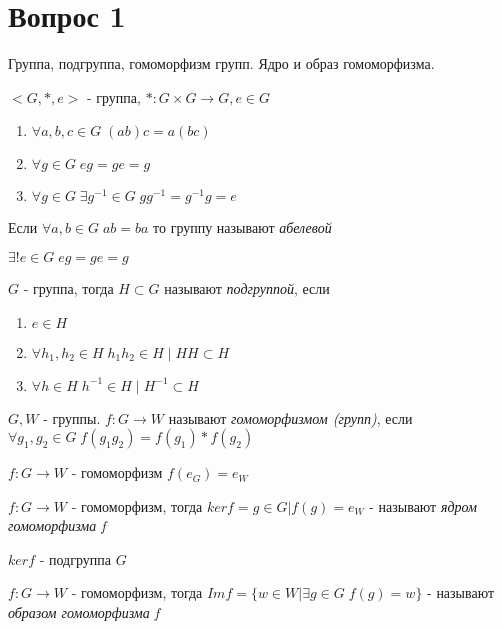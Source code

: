 \section{Вопрос 1}

Группа, подгруппа, гомоморфизм групп. Ядро и образ гомоморфизма. \newline

\begin{defn}
   \(<G, *, e>\) - группа, 
   \(*: G \times G \rightarrow G, e \in G \) 
   \begin{enumerate}       
     \item \( \forall a, b, c \in G \; (ab)c=a(bc) \)
     \item \( \forall g \in G \; eg = ge = g \)
     \item \( \forall g \in G \; \exists g^{-1} \in G \; gg^{-1} = g^{-1}g = e \)
   \end{enumerate}
   Если \( \forall a, b \in G \; ab = ba \) то группу называют \emph{абелевой} 
\end{defn}

\begin{thm}
  \( \exists ! e \in G \; eg = ge = g \)
\end{thm}

\begin{defn}
  \( G \) - группа, тогда \( H \subset G \) называют \emph{подгруппой}, если 
  \begin{enumerate}
    \item \( e \in H \)
    \item \( \forall h_1, h_2 \in H \; h_{1}h_{2} \in H \; | \; HH \subset H \)
    \item \( \forall h \in H \; h^{-1} \in H \; | \; H^{-1} \subset H \)
  \end{enumerate}
\end{defn}

\begin{defn}
  \( G, W \) - группы. \newline
  \( f: G \rightarrow W \) называют \emph{гомоморфизмом (групп)}, если \( \forall g_1, g_2 \in G \; f(g_{1}g_2) = f(g_1) * f(g_2) \)
\end{defn}

\begin{thm}
  \( f: G \rightarrow W \) - гомоморфизм \newline
  \( f(e_G) = e_W \)
\end{thm}

\begin{defn}
    \( f: G \rightarrow W \) - гомоморфизм, тогда \newline
    \( ker f = {g \in G | f(g) = e_W} \) - называют \emph{ядром гомоморфизма f}
\end{defn}

\begin{thm}
  \( ker f \) - подгруппа \( G \)
\end{thm}

\begin{defn}
   \( f: G \rightarrow W \) - гомоморфизм, тогда \newline
   \( Im f = \{ w \in W | \exists g \in G \; f(g) = w \} \) - называют \emph{образом гомоморфизма f}
\end{defn}
